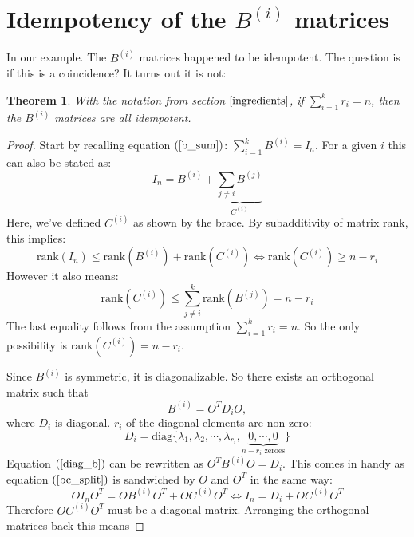 \documentclass[12pt, a4paper]{article}
\newtheorem{theorem}{Theorem}
\begin{document}
\section{Idempotency of the $B^{(i)}$ matrices}
In our example. The $B^{(i)}$ matrices happened to be idempotent. The question is if this is a coincidence? It turns out it is not:
\begin{theorem}
\label{b_idempotent}
With the notation from section $\ref{ingredients}$, if $\sum_{i=1}^k r_i=n$, then the $B^{(i)}$ matrices are all idempotent.
\end{theorem}
\begin{proof}
Start by recalling equation $(\ref{b_sum})$: $\sum_{i=1}^k B^{(i)}=I_n$. For a given $i$ this can also be stated as:
\begin{equation}
\label{bc_split}
I_n=B^{(i)} + \underbrace{\sum_{j\neq i}B^{(j)}}_{C^{(i)}}
\end{equation}
Here, we've defined $C^{(i)}$ as shown by the brace. By subadditivity of matrix rank, this implies:
\begin{equation}
\textrm{rank}(I_n)\le\textrm{rank}(B^{(i)})+\textrm{rank}(C^{(i)})\Leftrightarrow \textrm{rank}(C^{(i)})\ge n-r_i
\end{equation}
However it also means:
\begin{equation}
\textrm{rank}(C^{(i)})\le\sum_{j\neq i}^k\textrm{rank}(B^{(j)})=n-r_i
\end{equation}
The last equality follows from the assumption $\sum_{i=1}^k r_i=n$. So the only possibility is $\textrm{rank}(C^{(i)})=n-r_i$.\par
Since $B^{(i)}$ is symmetric, it is diagonalizable. So there exists an orthogonal matrix such that
\begin{equation}
\label{diag_b}
B^{(i)}=O^T D_iO,
\end{equation}
where $D_i$ is diagonal. $r_i$ of the diagonal elements are non-zero:
\begin{equation}
D_i=\textrm{diag}\{\lambda_1,\lambda_2,\cdots,\lambda_{r_i},\underbrace{0,\cdots,0}_{n-r_i\textrm{ zeroes}}\}
\end{equation}
Equation $(\ref{diag_b})$ can be rewritten as $O^T B^{(i)}O=D_i$. This comes in handy as equation $(\ref{bc_split})$ is sandwiched by $O$ and $O^T$ in the same way:
\begin{equation}
OI_n O^T=O B^{(i)}O^T+O C^{(i)}O^T\Leftrightarrow I_n = D_i + O C^{(i)}O^T
\end{equation}
Therefore $OC^{(i)}O^T$ must be a diagonal matrix. Arranging the orthogonal matrices back this means

\end{proof}
\end{document}
